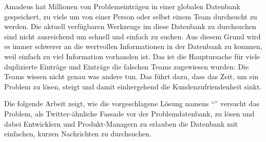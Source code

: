 Amadeus hat Millionen von Problemeinträgen in einer globalen Datenbank gespeichert, zu viele um von einer Person oder selbst einem Team durchsucht zu werden. Die aktuell verfügbaren Werkzeuge im diese Datenbank zu durchsuchen sind nicht ausreichend um schnell und einfach zu suchen. Aus diesem Grund wird es immer schwerer an die wertvollen Informationen in der Datenbank zu kommen, weil einfach zu viel Information vorhanden ist. Das ist die Hauptursache für viele duplizierte Einträge und Einträge die falschen Teams zugewiesen wurden: Die Teams wissen nicht genau was andere tun. Das führt dazu, dass das Zeit, um ein Problem zu lösen, steigt und damit einhergehend die Kundenzufriendenheit sinkt.

Die folgende Arbeit zeigt, wie die vorgeschlagene Lösung namens ``{\reporttitle}'' versucht das Problem, als Twitter-ähnliche Fassade vor der Problemdatenbank, zu lösen und dabei Entwicklern und Produkt-Managern zu erlauben die Datenbank mit einfachen, kurzen Nachrichten zu durchsuchen.